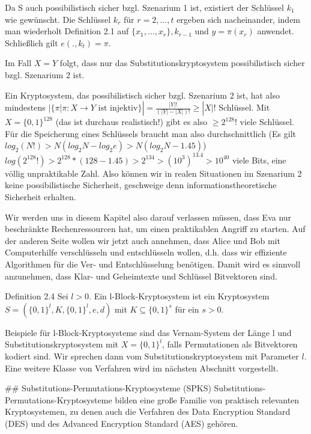 \documentclass[a4paper]{article}
\begin{document}
\begin{multicols}{3}
    Da S auch possibilistisch sicher bzgl. Szenarium 1 ist, existiert der Schlüssel $k_1$ wie gewünscht. Die Schlüssel $k_r$ für $r=2,...,t$ ergeben sich nacheinander, indem man wiederholt Definition 2.1 auf $\{x_1,...,x_r\},k_{r-1}$ und $y=\pi(x_r)$ anwendet. Schließlich gilt $e(.,k_t)=\pi$.

    Im Fall $X=Y$ folgt, dass nur das Substitutionskryptosystem possibilistisch sicher bzgl. Szenarium 2 ist.

    Ein Kryptosystem, das possibilistisch sicher bzgl. Szenarium 2 ist, hat also mindestens $|\{\pi |\pi :X\rightarrow Y\text{ ist injektiv}\}|=\frac{|Y|!}{(|Y|-|X|)!} \geq |X|!$ Schlüssel. Mit $X=\{0,1\}^{128}$  (das ist durchaus realistisch!) gibt es also $\geq 2^{128}!$ viele Schlüssel. Für die Speicherung eines Schlüssels braucht man also durchschnittlich (Es gilt $log_2(N!)>N(log_2 N-log_2 e)> N(log_2 N- 1.45)$) $log(2^{128}!)> 2^{128}*(128- 1.45)> 2^{134}>(10^3 )^{13.4} > 10^{40}$ viele Bits, eine völlig unpraktikable Zahl.
    Also können wir in realen Situationen im Szenarium 2 keine possibilistische Sicherheit, geschweige denn informationstheoretische Sicherheit erhalten.

    Wir werden uns in diesem Kapitel also darauf verlassen müssen, dass Eva nur beschränkte Rechenressourcen hat, um einen praktikablen Angriff zu starten. Auf der anderen Seite wollen wir jetzt auch annehmen, dass Alice und Bob mit Computerhilfe verschlüsseln und entschlüsseln wollen, d.h. dass wir effiziente Algorithmen für die Ver- und Entschlüsselung benötigen. Damit wird es sinnvoll anzunehmen, dass Klar- und Geheimtexte und Schlüssel Bitvektoren sind.

    Definition 2.4 Sei $l>0$. Ein l-Block-Kryptosystem ist ein Kryptosystem $S=(\{0,1\}^l,K,\{0,1\}^l,e,d)$ mit $K\subseteq \{0,1\}^s$ für ein $s>0$.

    Beispiele für l-Block-Kryptosysteme sind das Vernam-System der Länge l und Substitutionskryptosystem mit $X=\{0,1\}^l$, falls Permutationen als Bitvektoren kodiert sind. Wir sprechen dann vom Substitutionskryptosystem mit Parameter $l$.
    Eine weitere Klasse von Verfahren wird im nächsten Abschnitt vorgestellt.

    ## Substitutions-Permutations-Kryptosysteme (SPKS)
    Substitutions-Permutations-Kryptosysteme bilden eine große Familie von praktisch relevanten Kryptosystemen, zu denen auch die Verfahren des Data Encryption Standard (DES) und des Advanced Encryption Standard (AES) gehören.


\end{multicols}
\end{document}
